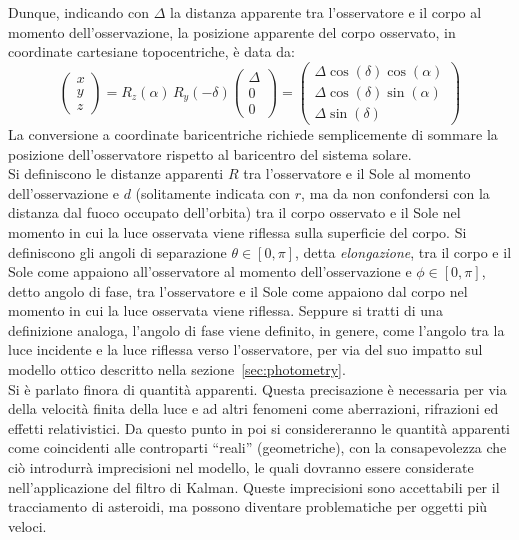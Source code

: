 \documentclass[12pt,a4paper,openright,twoside]{book}
\begin{document}
Dunque, indicando con $\Delta$ la distanza apparente tra l'osservatore e il corpo al momento dell'osservazione, la posizione apparente del corpo osservato, in coordinate cartesiane topocentriche, è data da:
\begin{equation}\label{eq:radec2pos}
\begin{pmatrix} x \\ y \\ z \end{pmatrix}=R_z(\alpha)\,R_y(-\delta)\begin{pmatrix} \Delta \\ 0 \\ 0 \end{pmatrix}=\begin{pmatrix} \Delta\cos(\delta)\cos(\alpha) \\ \Delta\cos(\delta)\sin(\alpha) \\ \Delta\sin(\delta) \end{pmatrix}
\end{equation}
La conversione a coordinate baricentriche richiede semplicemente di sommare la posizione dell'osservatore rispetto al baricentro del sistema solare. \\

Si definiscono le distanze apparenti $R$ tra l'osservatore e il Sole al momento dell'osservazione e $d$ (solitamente indicata con $r$, ma da non confondersi con la distanza dal fuoco occupato dell'orbita) tra il corpo osservato e il Sole nel momento in cui la luce osservata viene riflessa sulla superficie del corpo. Si definiscono gli angoli di separazione $\theta\in[0,\pi]$, detta \textit{elongazione}, tra il corpo e il Sole come appaiono all'osservatore al momento dell'osservazione e $\phi\in[0,\pi]$, detto angolo di fase, tra l'osservatore e il Sole come appaiono dal corpo nel momento in cui la luce osservata viene riflessa. Seppure si tratti di una definizione analoga, l'angolo di fase viene definito, in genere, come l'angolo tra la luce incidente e la luce riflessa verso l'osservatore, per via del suo impatto sul modello ottico descritto nella sezione~\ref{sec:photometry}. \\

Si è parlato finora di quantità apparenti. Questa precisazione è necessaria per via della velocità finita della luce e ad altri fenomeni come aberrazioni, rifrazioni ed effetti relativistici. Da questo punto in poi si considereranno le quantità apparenti come coincidenti alle controparti ``reali'' (geometriche), con la consapevolezza che ciò introdurrà imprecisioni nel modello, le quali dovranno essere considerate nell'applicazione del filtro di Kalman. Queste imprecisioni sono accettabili per il tracciamento di asteroidi, ma possono diventare problematiche per oggetti più veloci.
\end{document}
